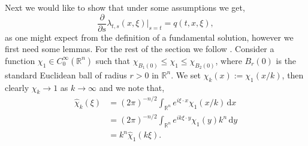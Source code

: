 \documentclass[a4paper, 12pt]{report}
\theoremstyle{remark}
\theoremstyle{definition}
\begin{document}
Next we would like to show that under some assumptions we get,
\begin{equation}
\frac{\partial}{\partial s}\lambda_{t, s}(x, \xi)\bigg|_{s = t} = q(t, x, \xi),
\end{equation}
as one might expect from the definition of a fundamental solution, however we first need some lemmas.  For the rest of the section we follow \cite{Conservative}.  Consider a function $\chi_1 \in C_0^\infty(\mathbb{R}^n)$ such that $\chi_{B_1(0)} \le \chi_1 \le \chi_{B_2(0)}$, where $B_r(0)$ is the standard Euclidean ball of radius $r > 0$ in $\mathbb{R}^n$.  We set $\chi_k(x) := \chi_1(x/k)$, then clearly $\chi_k \to 1$ as $k \to \infty$ and we note that,
$$
\begin{aligned}
\hat{\chi}_k(\xi) & = (2\pi)^{-n/2}\int_{\mathbb{R}^n}e^{i\xi\cdot x}\chi_1(x/k)\,\mathrm{d}x\\
& = (2\pi)^{-n/2}\int_{\mathbb{R}^n}e^{ik\xi\cdot y}\chi_1(y)k^n\,\mathrm{d}y\\
& = k^n\hat{\chi}_1(k\xi).
\end{aligned}
$$
\end{document}
